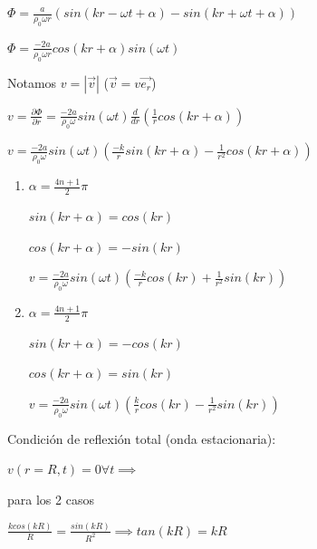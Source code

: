 \documentclass[10pt]{book}
\begin{document}
$\Phi = \frac{a}{\rho_0 \omega r} (sin(kr - \omega t + \alpha) - sin(kr + \omega t + \alpha))  $

$\Phi = \frac{-2a}{\rho_0 \omega r} cos(kr + \alpha) sin(\omega t)  $


Notamos $v = |\vec{v}|$ ($\vec{v} = v \vec{e_r}$)

$v = \frac{\partial \Phi}{\partial r} =  \frac{-2a}{\rho_0 \omega } sin(\omega t) \frac{d}{dr}(\frac{1}{r} cos(kr + \alpha)) $ 

$v = \frac{-2a}{\rho_0 \omega } sin(\omega t)(\frac{-k}{r} sin(kr + \alpha) - \frac{1}{r^2} cos(kr + \alpha) )  $ 

\begin{enumerate}

\item $\alpha = \frac{4n+1}{2} \pi $

$ sin(kr + \alpha) = cos(kr) $

$ cos(kr + \alpha) = -sin(kr) $

$v = \frac{-2a}{\rho_0 \omega } sin(\omega t)(\frac{-k}{r} cos(kr) + \frac{1}{r^2} sin(kr) )  $ 

\item $\alpha = \frac{4n+1}{2} \pi $

$ sin(kr + \alpha) = -cos(kr) $

$ cos(kr + \alpha) = sin(kr) $

$v = \frac{-2a}{\rho_0 \omega } sin(\omega t)(\frac{k}{r} cos(kr) - \frac{1}{r^2} sin(kr) )  $ 


\end{enumerate}






Condición de reflexión total (onda estacionaria):

$v(r=R,t) = 0 \forall t \implies $ 

para los 2 casos

$\frac{k cos(kR)}{R} = \frac{sin(kR)}{R^2} \implies tan(kR) = kR$
\end{document}
